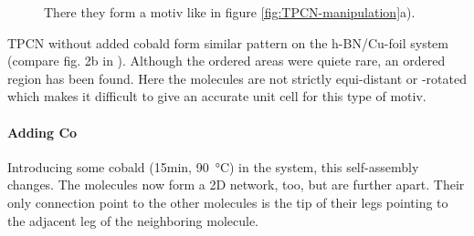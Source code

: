   \newpage
  \begin{figure}[!h]
  	\centering
  	\caption{There they form a motiv like in figure \ref{fig:TPCN-manipulation}a).}
  \end{figure}
  
  TPCN without added cobald form similar pattern on the h-BN/Cu-foil system (compare fig. 2b in \cite{urgel_controlling_2015}). Although the ordered areas were quiete rare, an ordered region has been found. Here the molecules are not strictly equi-distant or -rotated which makes it difficult to give an accurate unit cell for this type of motiv.
  
  \newpage
  \paragraph{Adding Co}
  Introducing some cobald (15min, \SI{90}{\celsius}) in the system, this self-assembly changes. The molecules now form a 2D network, too, but are further apart. Their only connection point to the other molecules is the tip of their legs pointing to the adjacent leg of the neighboring molecule.
  
